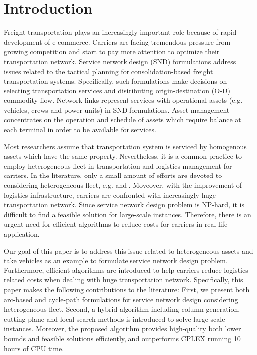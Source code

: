 \documentclass[11pt,nonblindrev,fleqn]{article}
\begin{document}
\section{Introduction}
Freight transportation plays an increasingly important role because of rapid development of e-commerce. Carriers are facing tremendous pressure from growing competition and start to pay more attention to optimize their transportation network. Service network design (SND) formulations address issues related to the tactical planning for consolidation-based freight transportation systems. Specifically, such formulations make decisions on selecting transportation services and distributing origin-destination (O-D) commodity flow. Network links represent services with operational assets (e.g. vehicles, crews and power units) in SND formulations. Asset management concentrates on the operation and schedule of assets which require balance at each terminal in order to be available for services.

Most researchers assume that transportation system is serviced by homogenous assets which have the same property. Nevertheless, it is a common practice to employ heterogeneous fleet in transportation and logistics management for carriers. In the literature, only a small amount of efforts are devoted to considering heterogeneous fleet, e.g. \cite{Kim1999Multimodal} and \cite{li2017design}. Moveover, with the improvement of logistics infrastructure, carriers are confronted with increasingly huge transportation network. Since service network design problem is NP-hard, it is difficult to find a feasible solution for large-scale instances. Therefore, there is an urgent need for efficient algorithms to reduce costs for carriers in real-life application.

Our goal of this paper is to address this issue related to heterogeneous assets and take vehicles as an example to formulate service network design problem. Furthermore, efficient algorithms are introduced to help carriers reduce logistics-related costs when dealing with huge transportation network. Specifically, this paper makes the following contributions to the literature: First, we present both arc-based and cycle-path formulations for service network design considering heterogeneous fleet. Second, a hybrid algorithm including column generation, cutting plane and local search methods is introduced to solve large-scale instances. Moreover, the proposed algorithm provides high-quality both lower bounds and feasible solutions efficiently, and outperforms CPLEX running 10 hours of CPU time.
\end{document}
